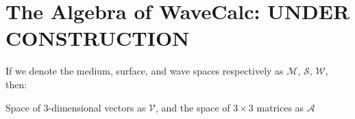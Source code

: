 \documentclass[11pt, reqno]{book}%
\newcounter{ct}
\begin{document}

\chapter{The Algebra of WaveCalc: UNDER CONSTRUCTION}
\label{chap:algebra}

If we denote the medium, surface, and wave spaces respectively as $\mathcal{M}$, $\mathcal{S}$, $\mathcal{W}$, then:

Space of 3-dimensional vectors as $\mathcal{V}$, and the space of $3\times 3$ matrices as $\mathcal{A}$
\end{document}
